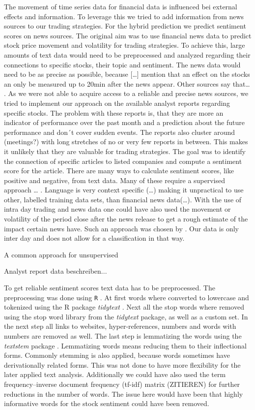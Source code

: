 The movement of time series data for financial data is influenced bei external effects and information. To leverage this we tried to add information from news sources to our trading strategies. For the hybrid prediction we predict sentiment scores on news sources. The original aim was to use financial news data to predict stock price movement and volatility for trading strategies. To achieve this, large amounts of text data would need to be preprocessed and analyzed regarding their connections to specific stocks, their topic and sentiment. The news data would need to be as precise as possible, because […] mention that an effect on the stocks an only be measured up to 20min after the news appear. Other sources say that… .
%
As we were not able to acquire access to a reliable and precise news sources, we tried to implement our approach on the available analyst reports regarding specific stocks. The problem with these reports is, that they are more an indicator of performance over the past month and a prediction about the future performance and don´t cover sudden events. The reports also cluster around (meetings?) with long stretches of no or very few reports in between. This makes it unlikely that they are valuable for trading strategies.
%
The goal was to identify the connection of specific articles to listed companies and compute a sentiment score for the article. There are many ways to calculate sentiment scores, like positive and negative, from text data. Many of these require a supervised approach … . Language is very context specific (…) making it unpractical to use other, labelled training data sets, than financial news data(…). With the use of intra day trading and news data one could have also used the movement or volatility of the period close after the news release to get a rough estimate of the impact certain news have. Such an approach was chosen by \citet{robertson2007news}. Our data is only inter day and does not allow for a classification in that way. 

A common approach for unsupervised 


Analyst report data beschreiben...

To get reliable sentiment scores text data has to be preprocessed. The preprocessing was done using \texttt{R} \citep{Rproject}. At first words where converted to lowercase and tokenized using the R package \textit{tidytext} \citep{tidytext}. Next all the stop words where removed using the stop word library from the \textit{tidytext} package, as well as a custom set. In the next step all links to websites, hyper-references, numbers and words with numbers are removed as well. 
The last step is lemmatizing the words using the \textit{textstem} package \citep{textstem}. Lemmatizing words means reducing them to their inflectional forms. Commonly stemming is also applied, because words sometimes have derivationally related forms. This was not done to have more flexibility for the later applied text analysis. Additionally we could have also used the term frequency–inverse document frequency (tf-idf) matrix (ZITIEREN) for further reductions in the number of words. The issue here would have been that highly informative words for the stock sentiment could have been removed. 

